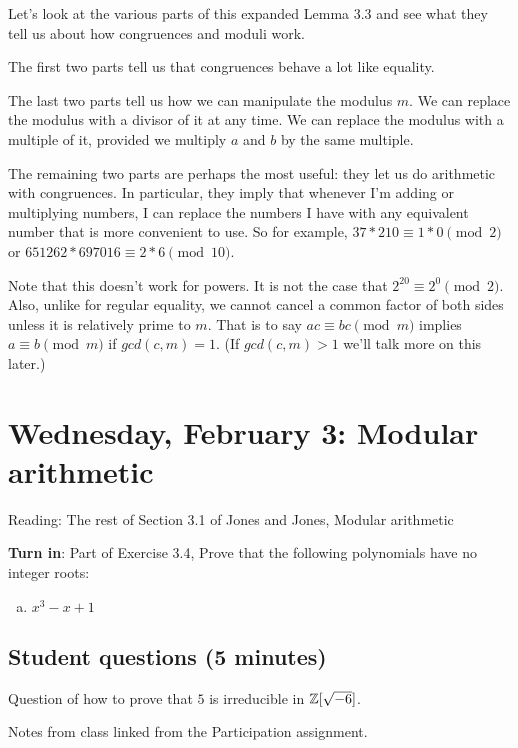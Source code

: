 \documentclass[letterpaper, 11 pt]{article}
\begin{document}
Let's look at the various parts of this expanded Lemma 3.3 and see what they tell us about how congruences and moduli work.

The first two parts tell us that congruences behave a lot like equality. 

The last two parts tell us how we can manipulate the modulus $m$. We can replace the modulus with a divisor of it at any time. We can replace the modulus with a multiple of it, provided we multiply $a$ and $b$ by the same multiple.

The remaining two parts are perhaps the most useful: they let us do arithmetic with congruences. In particular, they imply that whenever I'm adding or multiplying numbers, I can replace the numbers I have with any equivalent number that is more convenient to use. So for example, $37*210\equiv 1*0 \pmod{2}$ or $651262*697016 \equiv 2*6 \pmod{10}$.

Note that this doesn't work for powers. It is not the case that $2^{20} \equiv 2^0 \pmod{2}$. Also, unlike for regular equality, we cannot cancel a common factor of both sides unless it is relatively prime to $m$. That is to say $ac \equiv bc \pmod{m}$ implies $a\equiv b \pmod{m}$ if $gcd(c,m)=1$. (If $gcd(c,m)>1$ we'll talk more on this later.)



\section{Wednesday, February 3: Modular arithmetic}
Reading: The rest of Section 3.1 of Jones and Jones, Modular arithmetic

{\bf Turn in}: Part of Exercise 3.4,
Prove that the following polynomials have no integer roots:
\begin{enumerate}[(a)]
\item $x^3-x+1$
\end{enumerate}
\subsection{Student questions (5 minutes)}
Question of how to prove that $5$ is irreducible in $\mathbb Z[\sqrt{-6}]$.

Notes from class linked from the Participation assignment.

\end{document}
